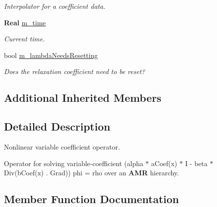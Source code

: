 \begin{DoxyCompactItemize}
\begin{DoxyCompactList}\small\item\em Interpolator for a coefficient data. \end{DoxyCompactList}\item 
\mbox{\label{class_a_m_r_non_linear_multi_comp_op_a70bf32d1723de157b96d70bd53d2f255}} 
\textbf{ Real} \hyperlink{class_a_m_r_non_linear_multi_comp_op_a70bf32d1723de157b96d70bd53d2f255}{m\+\_\+time}
\begin{DoxyCompactList}\small\item\em Current time. \end{DoxyCompactList}\item 
\mbox{\label{class_a_m_r_non_linear_multi_comp_op_a799454b3424eebb1f152b131cf6ea1f4}} 
bool \hyperlink{class_a_m_r_non_linear_multi_comp_op_a799454b3424eebb1f152b131cf6ea1f4}{m\+\_\+lambda\+Needs\+Resetting}
\begin{DoxyCompactList}\small\item\em Does the relaxation coefficient need to be reset? \end{DoxyCompactList}\end{DoxyCompactItemize}
\subsection*{Additional Inherited Members}


\subsection{Detailed Description}
Nonlinear variable coefficient operator. 

Operator for solving variable-\/coefficient (alpha $\ast$ a\+Coef(x) $\ast$ I -\/ beta $\ast$ Div(b\+Coef(x) . Grad)) phi = rho over an \textbf{ A\+MR} hierarchy. 

\subsection{Member Function Documentation}
\mbox{\label{class_a_m_r_non_linear_multi_comp_op_ad5c79a27d60fc17c24eea9c052aa84ac}} 
